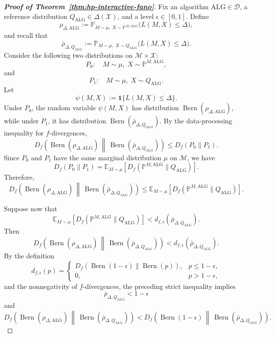 \documentclass[journal]{IEEEtran}
\newcommand{\Bern}{\operatorname{Bern}}
\newcommand{\ALG}{\mathrm{ALG}}
\begin{document}
\begin{proof}[\textbf{Proof of Theorem~\ref{thm:hp-interactive-fano}}]
Fix an algorithm \(\ALG\in\mathcal D\), a reference distribution
\(Q_\ALG\in\Delta(\mathcal X)\), and a level \(\epsilon\in[0,1]\). Define
\[
\rho_{\Delta,\ALG}
:=
\mathbb P_{M\sim\mu,\;X\sim \mathbb P^{M,\ALG}}
\bigl(L(M,X)\le \Delta\bigr),
\]
and recall that
\[
\bar\rho_{\Delta,Q_\ALG}
:=
\mathbb P_{M\sim\mu,\;X\sim Q_\ALG}
\bigl(L(M,X)\le \Delta\bigr).
\]
Consider the following two distributions on \(\mathcal M\times\mathcal X\):
\[
P_0:\quad M\sim\mu,\;X\sim\mathbb P^{M,\ALG},
\]
and
\[
P_1:\quad M\sim\mu,\;X\sim Q_\ALG.
\]
Let
\[
\psi(M,X):=\mathbf 1\{L(M,X)\le \Delta\}.
\]
Under \(P_0\), the random variable \(\psi(M,X)\) has distribution
\(\Bern(\rho_{\Delta,\ALG})\), while under \(P_1\), it has distribution
\(\Bern(\bar\rho_{\Delta,Q_\ALG})\). By the data-processing inequality for
\(f\)-divergences,
\[
D_f\!\left(
\Bern(\rho_{\Delta,\ALG})
\,\middle\|\,
\Bern(\bar\rho_{\Delta,Q_\ALG})
\right)
\le
D_f(P_0\|P_1).
\]
Since \(P_0\) and \(P_1\) have the same marginal distribution \(\mu\) on
\(\mathcal M\), we have
\[
D_f(P_0\|P_1)
=
\mathbb E_{M\sim\mu}
\left[
D_f\!\left(\mathbb P^{M,\ALG}\|Q_\ALG\right)
\right].
\]
Therefore,
\[
D_f\!\left(
\Bern(\rho_{\Delta,\ALG})
\,\middle\|\,
\Bern(\bar\rho_{\Delta,Q_\ALG})
\right)
\le
\mathbb E_{M\sim\mu}
\left[
D_f\!\left(\mathbb P^{M,\ALG}\|Q_\ALG\right)
\right].
\]

Suppose now that
\[
\mathbb E_{M\sim\mu}
\left[
D_f\!\left(\mathbb P^{M,\ALG}\|Q_\ALG\right)
\right]
<
d_{f,\epsilon}(\bar\rho_{\Delta,Q_\ALG}).
\]
Then
\[
D_f\!\left(
\Bern(\rho_{\Delta,\ALG})
\,\middle\|\,
\Bern(\bar\rho_{\Delta,Q_\ALG})
\right)
<
d_{f,\epsilon}(\bar\rho_{\Delta,Q_\ALG}).
\]
By the definition
\[
d_{f,\epsilon}(p)
=
\begin{cases}
D_f\!\left(\Bern(1-\epsilon)\middle\|
\Bern(p)\right), & p\le 1-\epsilon,\\
0, & p>1-\epsilon,
\end{cases}
\]
and the nonnegativity of \(f\)-divergences, the preceding strict inequality
implies
\[
\bar\rho_{\Delta,Q_\ALG}<1-\epsilon
\]
and
\[
D_f\!\left(
\Bern(\rho_{\Delta,\ALG})
\,\middle\|\,
\Bern(\bar\rho_{\Delta,Q_\ALG})
\right)
<
D_f\!\left(
\Bern(1-\epsilon)
\,\middle\|\,
\Bern(\bar\rho_{\Delta,Q_\ALG})
\right).
\]


\end{proof}
\end{document}
